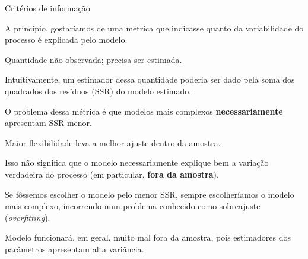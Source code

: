 \documentclass[11pt]{beamer}
\newenvironment{halfwideitemize}{\itemize\addtolength{\itemsep}{0.5em}}{\enditemize}
\begin{document}
\begin{frame}{Critérios de informação}
	\begin{halfwideitemize}
		\item A princípio, gostaríamos de uma métrica que indicasse quanto da variabilidade do processo é explicada pelo modelo.
		\begin{halfwideitemize}
			\item Quantidade não observada; precisa ser estimada.
		\end{halfwideitemize}
		\item Intuitivamente, um estimador dessa quantidade poderia ser dado pela soma dos quadrados dos resíduos (SSR) do modelo estimado.
		\item O problema dessa métrica é que modelos mais complexos \textbf{necessariamente} apresentam SSR menor.
		\begin{halfwideitemize}
			\item Maior flexibilidade leva a melhor ajuste dentro da amostra.
			\item Isso não significa que o modelo necessariamente explique bem a variação verdadeira do processo (em particular, \textbf{fora da amostra}).
		\end{halfwideitemize}
		\item Se fôssemos escolher o modelo pelo menor SSR, sempre escolheríamos o modelo mais complexo, incorrendo num problema conhecido como sobreajuste (\textit{overfitting}).
		\begin{halfwideitemize}
			\item Modelo funcionará, em geral, muito mal fora da amostra, pois estimadores dos parâmetros apresentam alta variância.
		\end{halfwideitemize}
	\end{halfwideitemize}
\end{frame}
\end{document}
